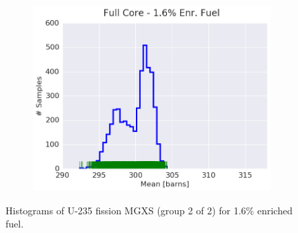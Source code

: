 \begin{figure}[h!]
\begin{subfigure}{0.5\textwidth}
  \includegraphics[width=\linewidth]{figures/patterns/full-core/hist-kde-rug/16-enr-fiss-2} \caption{}
  \label{fig:chap9-hist-full-core-1.6-fiss}
\end{subfigure}
\caption[Histogram of U-235 fission MGXS for 1.6\% enriched fuel]{Histograms of U-235 fission \ac{MGXS} (group 2 of 2) for 1.6\% enriched fuel.}
\label{fig:chap9-hist-1.6-fiss}
\end{figure}

